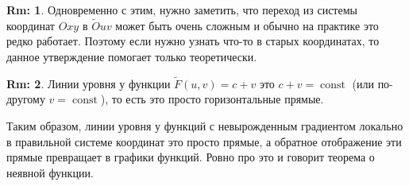 \documentclass[12pt]{article}
\theoremstyle{definition}
\newtheorem{rem}{Rm:}
\DeclareMathOperator{\const}{\text{const}}
\begin{document}
\begin{rem}
	Одновременно с этим, нужно заметить, что переход из системы координат $Oxy$ в $\widetilde{O} uv$ может быть очень сложным и обычно на практике это редко работает. Поэтому если нужно узнать что-то в старых координатах, то данное утверждение помогает только теоретически.
\end{rem}
\begin{rem}
	Линии уровня у функции $\widetilde{F}(u,v) = c + v$ это $c + v = \const$ (или по-другому $v = \const$), то есть это просто горизонтальные прямые. 
	
	Таким образом, линии уровня у функций с невырожденным градиентом локально в правильной системе координат это просто прямые, а обратное отображение эти прямые превращает в графики функций. Ровно про это и говорит теорема о неявной функции.
\end{rem}

\newpage
\end{document}
